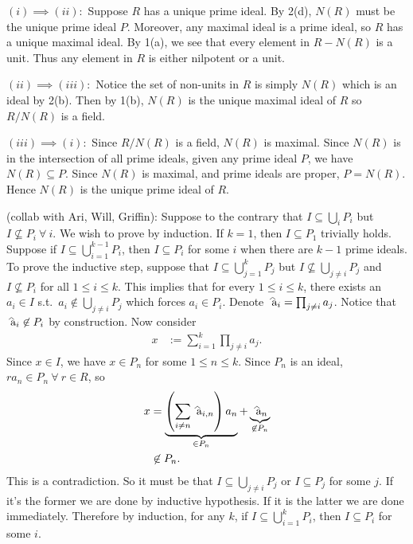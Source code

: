 \documentclass[12pt]{article}
\begin{document}
\begin{problem}[3]
$ (i) \implies (ii):$ Suppose $ R$ has a unique prime ideal. 
By 2(d), $ N(R)$ must be the unique prime ideal $ P$. Moreover, any maximal ideal is a prime ideal, so $ R$ has a unique maximal ideal. By 1(a), we see that every element in $ R - N(R) $ is a unit. Thus any element in $ R$ is either nilpotent or a unit.

$ (ii) \implies (iii):$ Notice the set of non-units in $ R$ is simply $ N(R)$ which is an ideal by 2(b). Then by 1(b), $ N(R)$ is the unique maximal ideal of  $ R$ so $ R /N(R)$ is a field.

 $ (iii) \implies (i):$ Since $ R /N(R)$ is a field,  $ N(R)$ is maximal. Since  $ N(R)$ is in the intersection of all prime ideals, given any prime ideal $ P$, we have $ N(R) \subseteq P$. Since $ N(R)$ is maximal, and prime ideals are proper, $ P = N(R)$. Hence $ N(R)$ is the unique prime ideal of  $ R$.
\end{problem}
\begin{problem}[4]
	(collab with Ari, Will, Griffin): Suppose to the contrary that $ I \subseteq \bigcup_{ i} P_i $ but $ I \not \subseteq P_i \ \forall \ i$. We wish to prove by induction. If $ k=1$, then  $ I \subseteq P_1$ trivially holds. Suppose if $I \subseteq \bigcup_{ i= 1}^{k-1} P_i$, then $ I \subseteq P_i$ for some $ i$ when there are $ k-1$ prime ideals. To prove the inductive step, suppose that $ I \subseteq \bigcup_{ j= 1}^{k} P_j $ but $ I \not \subseteq  \bigcup_{ j \neq i} P_j $ and $ I \not \subseteq P_i$ for all $ 1\leq i \leq k$. This implies that for every $1\leq i \leq k$, there exists an  $ a_i \in I$ s.t.\ $ a_i \not\in \bigcup_{ j\neq i} P_j $ which forces $ a_i \in P_i$. Denote $ \wh{ a}_i = \prod_{j \neq i} a_j$. Notice that $ \wh{ a}_i \not\in P_i$ by construction. Now consider
\begin{align*}
	x &:=\sum_{ i= 1}^{ k} \prod_{ j\neq i} a_j.
\end{align*}
Since $ x \in I$, we have $ x \in P_n$ for some $1\leq n \leq k$. Since $ P_n$ is an ideal, $ r a_n \in P_n \ \forall \ r \in R$, so
\begin{align*}
	x &= \underbrace{ \left(\sum_{i \neq n} \wh{ a}_{i,n} \right) a_{n} }_{ \in P_{n} }  + \underbrace{ \wh{ a}_n }_{ \not\in P_{n}}\\
	&\not\in P_n.
\end{align*}
This is a contradiction. So it must be that $ I \subseteq \bigcup_{ j \neq i} P_j $ or $ I \subseteq P_j$ for some $ j$. If it's the former we are done by inductive hypothesis. If it is the latter we are done immediately. Therefore by induction, for any $ k$, if $I \subseteq \bigcup_{ i= 1}^{k} P_i $, then $ I \subseteq P_i$ for some $ i$.
\end{problem}
\end{document}
